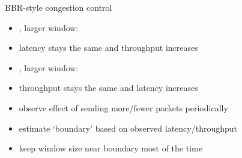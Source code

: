 \begin{frame}{BBR-style congestion control}
    \begin{itemize}
    \item {}, larger window:
    \item latency stays the same and throughput increases
    \vspace{.5cm}
    \item {}, larger window:
    \item throughput stays the same and latency increases
    \vspace{.5cm}
    \item<4-> observe effect of sending more/fewer packets periodically
    \item<4-> estimate `boundary' based on observed latency/throughput
    \item<4-> keep window size near boundary most of the time
    \end{itemize}
\end{frame}
